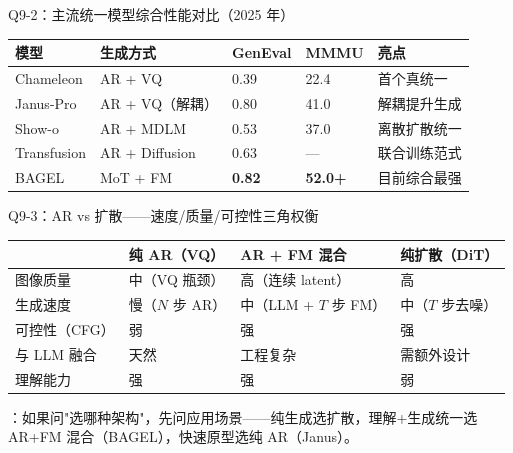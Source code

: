 \begin{conceptbox}{Q9-2：主流统一模型综合性能对比（2025 年）}
\begin{center}
\small
\begin{tabular}{|l|l|l|l|l|}
\hline
\textbf{模型} & \textbf{生成方式} & \textbf{GenEval} & \textbf{MMMU} & \textbf{亮点} \\
\hline
Chameleon & AR + VQ & 0.39 & 22.4 & 首个真统一 \\
Janus-Pro & AR + VQ（解耦） & 0.80 & 41.0 & 解耦提升生成 \\
Show-o & AR + MDLM & 0.53 & 37.0 & 离散扩散统一 \\
Transfusion & AR + Diffusion & 0.63 & — & 联合训练范式 \\
BAGEL & MoT + FM & \textbf{0.82} & \textbf{52.0+} & 目前综合最强 \\
\hline
\end{tabular}
\end{center}
\end{conceptbox}

\begin{conceptbox}{Q9-3：AR vs 扩散——速度/质量/可控性三角权衡}
\begin{center}
\small
\begin{tabular}{|l|l|l|l|}
\hline
& \textbf{纯 AR（VQ）} & \textbf{AR + FM 混合} & \textbf{纯扩散（DiT）} \\
\hline
图像质量 & 中（VQ 瓶颈） & 高（连续 latent） & 高 \\
生成速度 & 慢（$N$ 步 AR） & 中（LLM + $T$ 步 FM） & 中（$T$ 步去噪）\\
可控性（CFG） & 弱 & 强 & 强 \\
与 LLM 融合 & 天然 & 工程复杂 & 需额外设计 \\
理解能力 & 强 & 强 & 弱 \\
\hline
\end{tabular}
\end{center}

：如果问"选哪种架构"，先问应用场景——纯生成选扩散，理解+生成统一选 AR+FM 混合（BAGEL），快速原型选纯 AR（Janus）。
\end{conceptbox}

